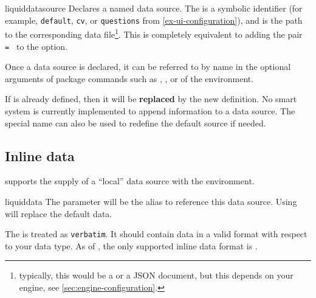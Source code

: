 \begin{docCommand}[doc
  new=2025-11-21]{liquiddatasource}{}{}
  Declares a named data source. %
  The  is a symbolic identifier (for example, \texttt{default},
  \texttt{cv}, or \texttt{questions} from \cref{ex-ui-configuration}), and
   is the path to the corresponding data
  file\footnote{typically, this would be a  or
    a {\sffamily JSON} document, but
    this depends on your engine, see \cref{sec:engine-configuration}.}. %
  This is completely equivalent to adding the pair
  \lstinline+ = + to the 
  option. %

  Once a data source is declared, it can be referred to by name in the
  optional arguments of package commands such as ,
  , or of the  environment. %

  \begin{blockwarning}
    If  is already defined, then it will be \textbf{replaced} by the
    new definition. %
    No smart system is currently implemented to append information to a
    data source. %
    The special name  can also be used to redefine the
    default source if needed. %
  \end{blockwarning}
\end{docCommand}

\clearpage
\subsection{Inline data}

\lqt{} supports the supply of a \enquote{local} data source with the
 environment. %

\begin{docEnvironment}[doc
  new=2025-11-21,doclang/environment content=inline
  data]{liquiddata}{}
  The  parameter will be the alias to reference this data
  source. %
  Using  will replace the default data. %

  The  is treated as \texttt{verbatim}. %
  It should contain data in a valid format with respect to your data
  type. %
  As of , the only supported inline data format is
  . %
\end{docEnvironment}

